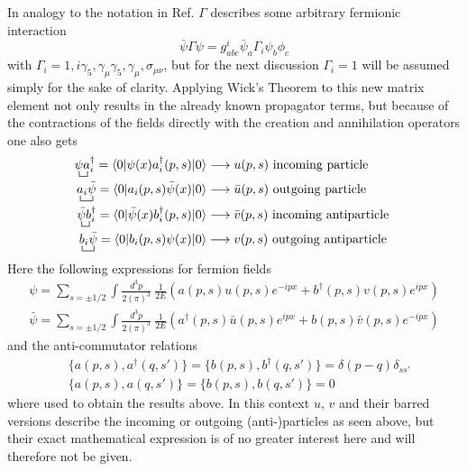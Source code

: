 In analogy to the notation in Ref.\cite{Denner:1992vza} $\Gamma$ describes some arbitrary fermionic interaction
\begin{equation*}
	\bar{\psi}\Gamma\psi=g^i_{abc}\bar{\psi}_a\Gamma_i\psi_b\phi_c
\end{equation*}
with $\Gamma_i=1,i\gamma_5,\gamma_\mu\gamma_5,\gamma_\mu,\sigma_{\mu\nu}$, but for the next discussion $\Gamma_i=1$ will be assumed simply for the sake of clarity. \newline
Applying Wick's Theorem to this new matrix element not only results in the already known propagator terms, but because of the contractions of the fields directly with the creation and annihilation operators one also gets
\begin{align*}
		\bcontraction{}{\psi}{}{a}\psi a_i^\dagger=\braket{0|\psi(x) a_i^\dagger(p,s)|0}&\longrightarrow u(p,s) \text{ incoming particle }\\
		\bcontraction{}{a}{{}_i}{\bar{\psi}}a_i\bar{\psi}=\braket{0|a_i(p,s)\bar{\psi}(x)|0}&\longrightarrow \bar{u}(p,s) \text{ outgoing particle }\\
		\bcontraction{}{\bar{\psi}}{}{b}\bar{\psi} b_i^\dagger=\braket{0|\bar{\psi}(x) b_i^\dagger(p,s)|0}&\longrightarrow \bar{v}(p,s)\text{ incoming antiparticle }\\
		\bcontraction{}{b}{{}_i}{\psi}b_i\bar{\psi}=\braket{0|b_i(p,s)\psi(x)|0}&\longrightarrow v(p,s)\text{ outgoing antiparticle }
\end{align*}
Here the following expressions for fermion fields
\begin{align*}
\psi=\sum_{s=\pm1/2}\int \frac{d^3p}{2(\pi)^3}\:\frac{1}{2E}\left(a(p,s)u(p,s)e^{-ipx}+b^\dagger(p,s)v(p,s)e^{ipx}\right)\\
\bar{\psi}=\sum_{s=\pm1/2}\int \frac{d^3p}{2(\pi)^3}\:\frac{1}{2E}\left(a^\dagger(p,s)\bar{u}(p,s)e^{ipx}+b(p,s)\bar{v}(p,s)e^{-ipx}\right)
\end{align*}
and the anti-commutator relations
\begin{align*}
		&\{a(p,s),a^\dagger(q,s')\}=\{b(p,s),b^\dagger(q,s')\}=\delta(p-q)\delta_{ss'}\\
		&\{a(p,s),a(q,s')\}=\{b(p,s),b(q,s')\}=0
\end{align*}
where used to obtain the results above.
In this context $u$, $v$ and their barred versions describe the incoming or outgoing (anti-)particles as seen above, but their exact mathematical expression is of no greater interest here and will therefore not be given. \newline

